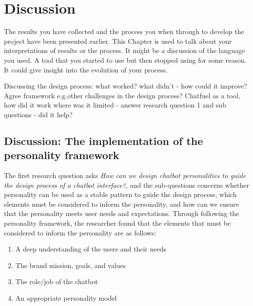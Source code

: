 \chapter{Discussion}
\label{chap:discussion}

The results you have collected and the process you when through to develop the project have been presented earlier.  This Chapter is used to talk about your interpretations of results or the process.  It might be a discussion of the language you used.  A tool that you started to use but then stopped using for some reason.  It could give insight into the evolution of your process.

Discussing the design process: what worked? what didn't - how could it improve? Agree framework e.g.other challenges in the design process? Chatfuel as a tool, how did it work where was it limited - answer research question 1 and sub questions - did it help?

\section{Discussion: The implementation of the personality framework}

The first research question asks \textit{How can we design chatbot personalities to guide the design process of a chatbot interface?}, and the sub-questions concerns whether personality can be used as a stable pattern to guide the design process, which elements must be considered to inform the personality, and how can we ensure that the personality meets user needs and expectations. Through following the personality framework, the researcher found that the elements that must be considered to inform the personality are as follows:

\begin{enumerate}
    \item A deep understanding of the users and their needs
    \item The brand mission, goals, and values
    \item The role/job of the chatbot
    \item An appropriate personality model
\end{enumerate}


